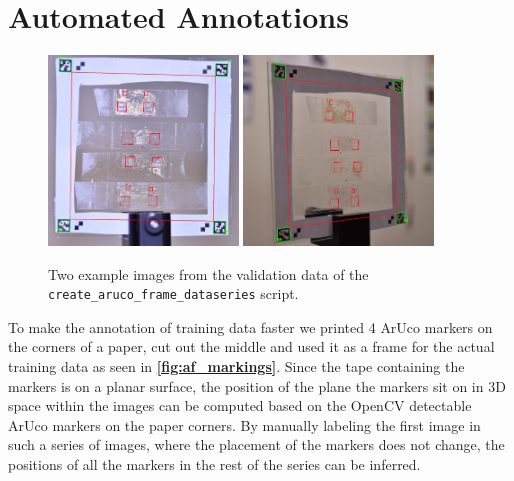 \documentclass[10pt]{book}
\newcommand{\figureref}[1]{\textbf{\autoref{#1}}}
\begin{document}
\section{Automated Annotations}

\begin{figure}
  \centering
     {\includegraphics[width=0.45\textwidth]{image/af_markings_1}}
     {\includegraphics[width=0.45\textwidth]{image/af_markings_2}}
  \caption{Two example images from the validation data of the \texttt{create\_aruco\_frame\_dataseries} script.}
  \label{fig:af_markings}
\end{figure}

To make the annotation of training data faster we printed 4 \ac{ArUco} markers on the corners of a paper, cut out the middle and used it as a frame for the actual training data as seen in \figureref{fig:af_markings}. Since the tape containing the markers is on a planar surface, the position of the plane the markers sit on in 3D space within the images can be computed based on the \ac{OpenCV} detectable \ac{ArUco} markers on the paper corners. By manually labeling the first image in such a series of images, where the placement of the markers does not change, the positions of all the markers in the rest of the series can be inferred.
\end{document}
